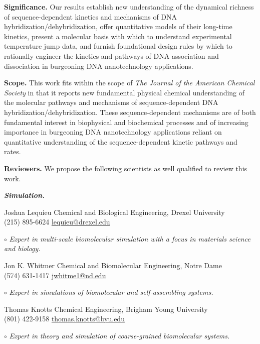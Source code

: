 \documentclass[11pt,a4paper]{letter} %
\begin{document}
\begin{letter}
\textbf{Significance.} Our results establish new understanding of the dynamical richness of sequence-dependent kinetics and mechanisms of DNA hybridization/dehybridization, offer quantitative models of their long-time kinetics, present a molecular basis with which to understand experimental temperature jump data, and furnish foundational design rules by which to rationally engineer the kinetics and pathways of DNA association and dissociation in burgeoning DNA nanotechnology applications.

\textbf{Scope.}  This work fits within the scope of \textit{The Journal of the American Chemical Society} in that it reports new fundamental physical chemical understanding of the molecular pathways and mechanisms of sequence-dependent DNA hybridization/dehybridization. These sequence-dependent mechanisms are of both fundamental interest in biophysical and biochemical processes and of increasing importance in burgeoning DNA nanotechnology applications reliant on quantitative understanding of the sequence-dependent kinetic pathways and rates.


\textbf{Reviewers.} We propose the following scientists as well qualified to review this work.

\textbf{\textit{Simulation.}}

Joshua Lequieu \hfill Chemical and Biological Engineering, Drexel University \\
(215) 895-6624 \hfill \url{lequieu@drexel.edu}

$\circ$ \textit{Expert in multi-scale biomolecular simulation with a focus in materials science and biology.}

Jon K. Whitmer \hfill Chemical and Biomolecular Engineering, Notre Dame \\
(574) 631-1417 \hfill \url{jwhitme1@nd.edu}

$\circ$ \textit{Expert in simulations of biomolecular and self-assembling systems.}

Thomas Knotts \hfill Chemical Engineering, Brigham Young University \\
(801) 422-9158 \hfill \url{thomas.knotts@byu.edu}

$\circ$ \textit{Expert in theory and simulation of coarse-grained biomolecular systems.}



\end{letter}
\end{document}
